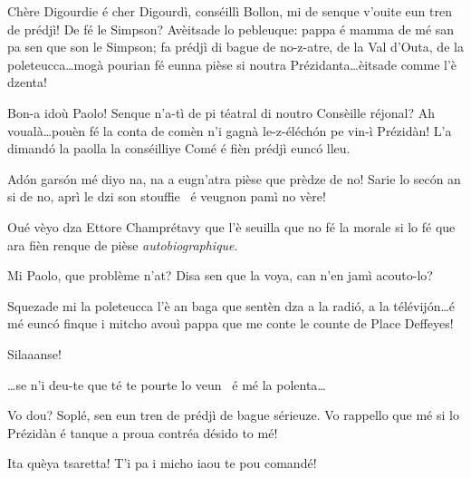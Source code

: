 \begin{drama}

\Dallasspeaks Chère Digourdie é cher Digourdì, conséillì Bollon, mi de senque v'ouite eun tren de prédjì! De fé le Simpson? Avèitsade lo pebleuque: pappa é mamma de mé san pa sen que son le Simpson; fa prédjì di bague de no-z-atre, de la Val d'Outa, de la poleteucca\ldots mogà pourian fé eunna pièse si noutra Prézidanta\ldots èitsade comme l'è dzenta!

\Presidanspeaks Bon-a idoù Paolo! Senque n'a-tì de pi téatral di noutro Consèille réjonal? Ah voualà\ldots pouèn fé la conta de comèn n'i gagnà le-z-éléch\'on pe vin-ì Prézidàn!  L’a dimand\'o la paolla la conséilliye Comé é fièn prédjì eunc\'o lleu.

\Sophiespeaks Ad\'on gars\'on mé diyo na, na a eugn'atra pièse que prèdze de no! Sarie lo sec\'on an si de no, aprì le dzi son stouffie \stufo\ é veugnon pamì no vère!

\Cimaspeaks Oué vèyo dza Ettore Champrétavy que l'è seuilla  que no fé la morale si lo fé que ara fièn renque de pièse \textit{autobiographique}.

\Joellespeaks Mi Paolo, que problème n'at? Disa sen que la voya, can n'en jamì acouto-lo?


\Eyviaspeaks Squezade mi la poleteucca l'è an baga que sentèn dza a la radi\'o, a la télévij\'on\ldots é mé eunc\'o finque i mitcho avouì pappa que me conte le counte de Place Deffeyes!


\Presidanspeaks{} Silaaanse! 


\Secreteospeaks \ldots se n'i deu-te que té te pourte lo veun \wine\ é mé la polenta\ldots


\Presidanspeaks Vo dou? Soplé, sen eun tren de prédjì de bague sérieuze.  Vo rappello que mé si lo Prézidàn é tanque a proua contréa désido to mé!

\Marcospeaks Ita quèya tsaretta! T'i pa i micho iaou te pou comandé!


\end{drama}
